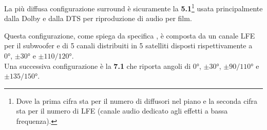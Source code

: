 \documentclass[12pt,a4paper]{report}
\begin{document}
La più diffusa configurazione surround è sicuramente la \textbf{5.1}\footnote{Dove la prima cifra sta per il numero di diffusori nel piano e la seconda cifra sta per il numero di LFE (canale audio dedicato agli effetti a bassa frequenza).} usata principalmente dalla Dolby e dalla DTS per riproduzione di audio per film.


Questa configurazione, come spiega da specifica \cite{5.1}, è composta da un canale LFE per il subwoofer e di 5 canali distribuiti in 5 satelliti disposti rispettivamente a 0°, $\pm30°$ e $\pm110/120°$.\\


Una successiva configurazione è la \textbf{7.1} che riporta angoli di 0°, $\pm30°$, $\pm90/110°$ e $\pm135/150°$.\\

\end{document}
